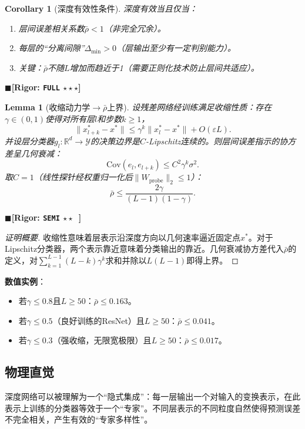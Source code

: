 \documentclass[12pt,a4paper]{ctexart}
\newtheorem{lemma}[theorem]{Lemma}
\newtheorem{corollary}[theorem]{Corollary}
\theoremstyle{definition}
\theoremstyle{remark}
\newcommand{\rigorFull}{$\blacksquare$\;\textbf{[Rigor: \texttt{FULL} $\star\star\star$]}}
\newcommand{\rigorSemi}{$\blacksquare$\;\textbf{[Rigor: \texttt{SEMI} $\star\star\;\;$]}}
\begin{document}
\begin{corollary}[深度有效性条件]
\label{cor:2}
深度有效当且仅当：
\begin{enumerate}[label=\arabic*.]
\item 层间误差相关系数$\bar{\rho} < 1$（非完全冗余）。
\item 每层的``分离间隙''$\Delta_{\min} > 0$（层输出至少有一定判别能力）。
\item 关键：$\bar{\rho}$不随$L$增加而趋近于1（需要正则化技术防止层间共适应）。
\end{enumerate}
\end{corollary}
\rigorFull

\begin{lemma}[收缩动力学$\to\bar{\rho}$上界]
\label{lem:3.1}
设残差网络经训练满足收缩性质：存在$\gamma \in (0, 1)$使得对所有层$l$和步数$k \geq 1$，
\begin{equation}
\boxed{\|x_{l+k}^* - x^*\| \leq \gamma^k \|x_l^* - x^*\| + O(\varepsilon L)}.
\end{equation}
并设层分类器$g_l: \mathbb{R}^d \to \mathcal{Y}$的决策边界是$C$-Lipschitz连续的。则层间误差指示的协方差呈几何衰减：
\begin{equation}
\boxed{\mathrm{Cov}(e_l, e_{l+k}) \leq C^2 \gamma^k \sigma^2}.
\end{equation}
取$C=1$（线性探针经权重归一化后$\|W_{\text{probe}}\|_2 \leq 1$）：
\begin{equation}
\boxed{\bar{\rho} \leq \frac{2\gamma}{(L-1)(1-\gamma)}}.
\end{equation}
\end{lemma}
\rigorSemi

\begin{proof}[证明概要]
收缩性意味着层表示沿深度方向以几何速率逼近固定点$x^*$。对于Lipschitz分类器，两个表示靠近意味着分类输出的靠近。几何衰减协方差代入$\bar{\rho}$的定义，对$\sum_{k=1}^{L-1} (L-k)\gamma^k$求和并除以$L(L-1)$即得上界。
\end{proof}

\textbf{数值实例}：
\begin{itemize}
\item 若$\gamma \leq 0.8$且$L \geq 50$：$\bar{\rho} \leq 0.163$。
\item 若$\gamma \leq 0.5$（良好训练的ResNet）且$L \geq 50$：$\bar{\rho} \leq 0.041$。
\item 若$\gamma \leq 0.3$（强收缩，无限宽极限）且$L \geq 50$：$\bar{\rho} \leq 0.017$。
\end{itemize}

\subsection{物理直觉}
深度网络可以被理解为一个``隐式集成''：每一层输出一个对输入的变换表示，在此表示上训练的分类器等效于一个``专家''。不同层表示的不同粒度自然使得预测误差不完全相关，产生有效的``专家多样性''。
\end{document}
